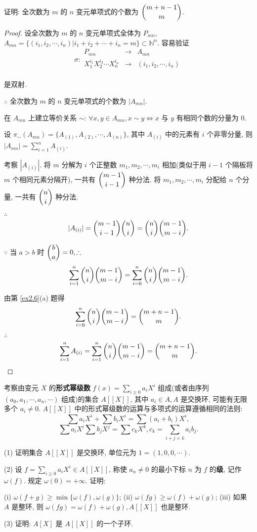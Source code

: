 \documentclass[UTF8]{ctexart}
\begin{document}
\begin{exercise}[2.4]
    证明: 全次数为 $m$ 的 $n$ 变元单项式的个数为 $\dbinom{m+n-1}{m}$.
\end{exercise}
\begin{proof}
    设全次数为 $m$ 的 $n$ 变元单项式全体为 $P_{mn}$, $A_{mn}=\{(i_1,i_2,\cdots,i_n)|i_1+i_2+\cdots+i_n=m\}\subset\mathbb{N}^n$. 容易验证
    \[\sigma:\begin{array}{rcl}
        P_{mn} & \to & A_{mn} \\
        X_1^{i_1}X_2^{i_2}\cdots X_n^{i_n} & \to & (i_1,i_2,\cdots,i_n) \\
    \end{array}\]

    是双射.

    $\therefore$ 全次数为 $m$ 的 $n$ 变元单项式的个数为 $|A_{mn}|$.

    在 $A_{mn}$ 上建立等价关系 $\sim$: $\forall x,y\in A_{mn},x\sim y\Leftrightarrow x$ 与 $y$ 有相同个数的分量为 $0$.

    设 $\pi_\sim(A_{mn})=\{A_{(1)},A_{(2)},\cdots,A_{(n)}\}$, 其中 $A_{(i)}$ 中的元素有 $i$ 个非零分量, 则 $|A_{mn}|=\sum\limits_{i=1}^nA_{(i)}$.

    考察 $|A_{(i)}|$. 将 $m$ 分解为 $i$ 个正整数 $m_1,m_2,\cdots,m_i$ 相加(类似于用 $i-1$ 个隔板将 $m$ 个相同元素分隔开), 一共有 $\dbinom{m-1}{i-1}$ 种分法. 将 $m_1,m_2,\cdots,m_i$ 分配给 $n$ 个分量, 一共有 $\dbinom{n}{i}$ 种分法.

    $\therefore$
    \[|A_{(i)}|=\dbinom{m-1}{i-1}\dbinom{n}{i}=\dbinom{n}{i}\dbinom{m-1}{m-i}.\]

    $\because$ 当 $a>b$ 时 $\dbinom{b}{a}=0,\therefore$
    \[\sum\limits_{i=1}^n\dbinom{n}{i}\dbinom{m-1}{m-i}=\sum\limits_{i=0}^n\dbinom{n}{i}\dbinom{m-1}{m-i}.\]

    由第 \ref{ex2.6}(a) 题得
    \[\sum\limits_{i=0}^n\dbinom{n}{i}\dbinom{m-1}{m-i}=\dbinom{m+n-1}{m}.\]

    $\therefore$
    \[\sum\limits_{i=1}^nA_{(i)}=\sum\limits_{i=1}^n\dbinom{n}{i}\dbinom{m-1}{m-i}=\dbinom{m+n-1}{m}.\qedhere\]
\end{proof}
\begin{exercise}[2.5]\label{ex2.5}
    考察由变元 $X$ 的\textbf{形式幂级数} $f(x)=\sum\limits_{i\geq0}a_iX^i$ 组成(或者由序列 $(a_0,a_1,\cdots,a_n,\cdots)$ 组成)的集合 $A[[X]]$, 其中 $a_i\in A,A$ 是交换环, 可能有无限多个 $a_i\neq0$. $A[[X]]$ 中的形式幂级数的运算与多项式的运算遵循相同的法则:
    \[\sum a_iX^i+\sum b_iX^i=\sum(a_i+b_i)X^i,\]
    \[\sum a_iX^i\sum b_jX^j=\sum c_kX^k,c_k=\sum\limits_{i+j=k}a_ib_j.\]

    (1) 证明集合 $A[[X]]$ 是交换环, 单位元为 $1=(1,0,0,\cdots)$.

    (2) 设 $f=\sum\limits_{i\geq0}a_iX^i\in A[[X]]$, 称使 $a_n\neq0$ 的最小下标 $n$ 为 $f$ 的\textbf{级}, 记作 $\omega(f)$. 规定 $\omega(0)=+\infty$. 证明:

    (i) $\omega(f+g)\geq\min\{\omega(f),\omega(g)\}$; (ii) $\omega(fg)\geq\omega(f)+\omega(g)$; (iii) 如果 $A$ 是整环, 则 $\omega(fg)=\omega(f)+\omega(g),A[[X]]$ 也是整环.
    
    (3) 证明: $A[X]$ 是 $A[[X]]$ 的一个子环.
\end{exercise}
\end{document}
